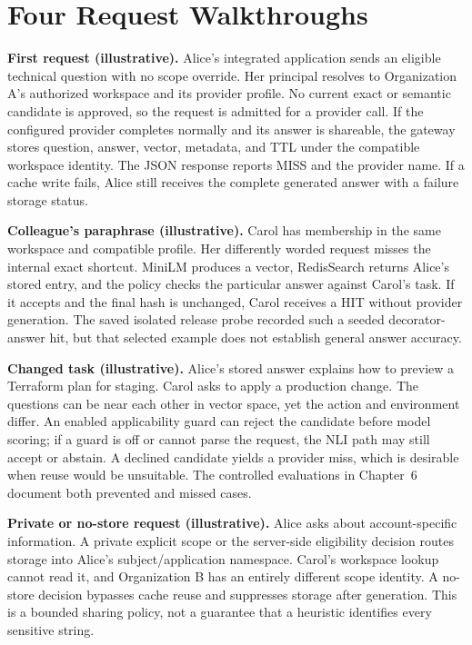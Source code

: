 \section{Four Request Walkthroughs}
\textbf{First request (illustrative).} Alice's integrated application sends an eligible technical question with no scope override. Her principal resolves to Organization A's authorized workspace and its provider profile. No current exact or semantic candidate is approved, so the request is admitted for a provider call. If the configured provider completes normally and its answer is shareable, the gateway stores question, answer, vector, metadata, and TTL under the compatible workspace identity. The JSON response reports MISS and the provider name. If a cache write fails, Alice still receives the complete generated answer with a failure storage status.

\textbf{Colleague's paraphrase (illustrative).} Carol has membership in the same workspace and compatible profile. Her differently worded request misses the internal exact shortcut. MiniLM produces a vector, RedisSearch returns Alice's stored entry, and the policy checks the particular answer against Carol's task. If it accepts and the final hash is unchanged, Carol receives a HIT without provider generation. The saved isolated release probe recorded such a seeded decorator-answer hit, but that selected example does not establish general answer accuracy.

\textbf{Changed task (illustrative).} Alice's stored answer explains how to preview a Terraform plan for staging. Carol asks to apply a production change. The questions can be near each other in vector space, yet the action and environment differ. An enabled applicability guard can reject the candidate before model scoring; if a guard is off or cannot parse the request, the NLI path may still accept or abstain. A declined candidate yields a provider miss, which is desirable when reuse would be unsuitable. The controlled evaluations in Chapter~6 document both prevented and missed cases.

\textbf{Private or no-store request (illustrative).} Alice asks about account-specific information. A private explicit scope or the server-side eligibility decision routes storage into Alice's subject/application namespace. Carol's workspace lookup cannot read it, and Organization B has an entirely different scope identity. A no-store decision bypasses cache reuse and suppresses storage after generation. This is a bounded sharing policy, not a guarantee that a heuristic identifies every sensitive string.
